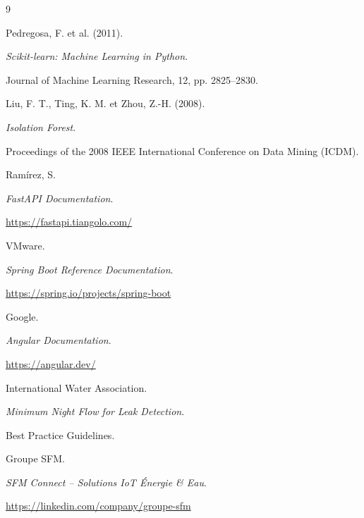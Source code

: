 \documentclass[12pt,a4paper,twoside]{report}
\begin{document}
\begin{thebibliography}{9}



Pedregosa, F. et al. (2011).

\textit{Scikit-learn: Machine Learning in Python}.

Journal of Machine Learning Research,
12, pp. 2825--2830.


Liu, F. T., Ting, K. M. et Zhou, Z.-H. (2008).

\textit{Isolation Forest}.

Proceedings of the 2008 IEEE International Conference on
Data Mining (ICDM).


Ramírez, S.

\textit{FastAPI Documentation}.

\url{https://fastapi.tiangolo.com/}


VMware.

\textit{Spring Boot Reference Documentation}.

\url{https://spring.io/projects/spring-boot}


Google.

\textit{Angular Documentation}.

\url{https://angular.dev/}


International Water Association.

\textit{Minimum Night Flow for Leak Detection}.

Best Practice Guidelines.


Groupe SFM.

\textit{SFM Connect -- Solutions IoT Énergie \& Eau}.

\url{https://linkedin.com/company/groupe-sfm}

\end{thebibliography}


\appendix


\end{document}
